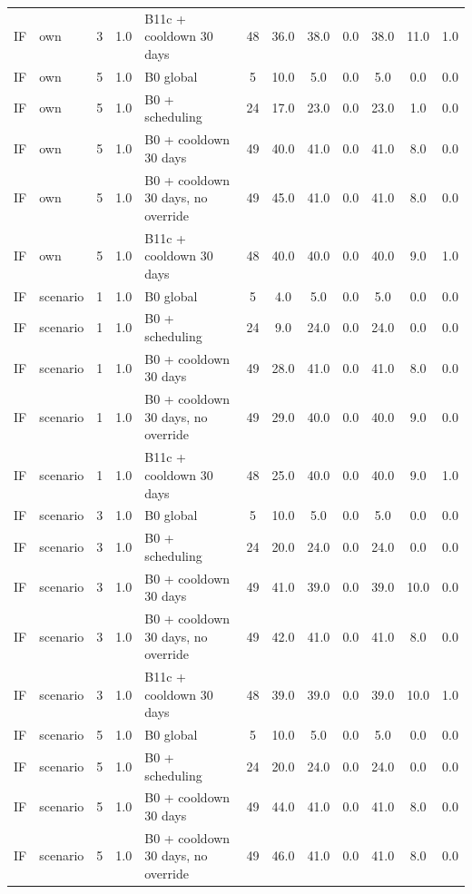 \documentclass[10pt,onecolumn,letterpaper]{article}
\begin{document}
\begin{longtable}{lllllccccccc}
IF & own & 3 & 1.0 & B11c + cooldown 30 days & 48 & 36.0 & 38.0 & 0.0 & 38.0 & 11.0 & 1.0 \\
IF & own & 5 & 1.0 & B0 global & 5 & 10.0 & 5.0 & 0.0 & 5.0 & 0.0 & 0.0 \\
IF & own & 5 & 1.0 & B0 + scheduling & 24 & 17.0 & 23.0 & 0.0 & 23.0 & 1.0 & 0.0 \\
IF & own & 5 & 1.0 & B0 + cooldown 30 days & 49 & 40.0 & 41.0 & 0.0 & 41.0 & 8.0 & 0.0 \\
IF & own & 5 & 1.0 & B0 + cooldown 30 days, no override & 49 & 45.0 & 41.0 & 0.0 & 41.0 & 8.0 & 0.0 \\
IF & own & 5 & 1.0 & B11c + cooldown 30 days & 48 & 40.0 & 40.0 & 0.0 & 40.0 & 9.0 & 1.0 \\
IF & scenario & 1 & 1.0 & B0 global & 5 & 4.0 & 5.0 & 0.0 & 5.0 & 0.0 & 0.0 \\
IF & scenario & 1 & 1.0 & B0 + scheduling & 24 & 9.0 & 24.0 & 0.0 & 24.0 & 0.0 & 0.0 \\
IF & scenario & 1 & 1.0 & B0 + cooldown 30 days & 49 & 28.0 & 41.0 & 0.0 & 41.0 & 8.0 & 0.0 \\
IF & scenario & 1 & 1.0 & B0 + cooldown 30 days, no override & 49 & 29.0 & 40.0 & 0.0 & 40.0 & 9.0 & 0.0 \\
IF & scenario & 1 & 1.0 & B11c + cooldown 30 days & 48 & 25.0 & 40.0 & 0.0 & 40.0 & 9.0 & 1.0 \\
IF & scenario & 3 & 1.0 & B0 global & 5 & 10.0 & 5.0 & 0.0 & 5.0 & 0.0 & 0.0 \\
IF & scenario & 3 & 1.0 & B0 + scheduling & 24 & 20.0 & 24.0 & 0.0 & 24.0 & 0.0 & 0.0 \\
IF & scenario & 3 & 1.0 & B0 + cooldown 30 days & 49 & 41.0 & 39.0 & 0.0 & 39.0 & 10.0 & 0.0 \\
IF & scenario & 3 & 1.0 & B0 + cooldown 30 days, no override & 49 & 42.0 & 41.0 & 0.0 & 41.0 & 8.0 & 0.0 \\
IF & scenario & 3 & 1.0 & B11c + cooldown 30 days & 48 & 39.0 & 39.0 & 0.0 & 39.0 & 10.0 & 1.0 \\
IF & scenario & 5 & 1.0 & B0 global & 5 & 10.0 & 5.0 & 0.0 & 5.0 & 0.0 & 0.0 \\
IF & scenario & 5 & 1.0 & B0 + scheduling & 24 & 20.0 & 24.0 & 0.0 & 24.0 & 0.0 & 0.0 \\
IF & scenario & 5 & 1.0 & B0 + cooldown 30 days & 49 & 44.0 & 41.0 & 0.0 & 41.0 & 8.0 & 0.0 \\
IF & scenario & 5 & 1.0 & B0 + cooldown 30 days, no override & 49 & 46.0 & 41.0 & 0.0 & 41.0 & 8.0 & 0.0 \\

\end{longtable}
\end{document}
